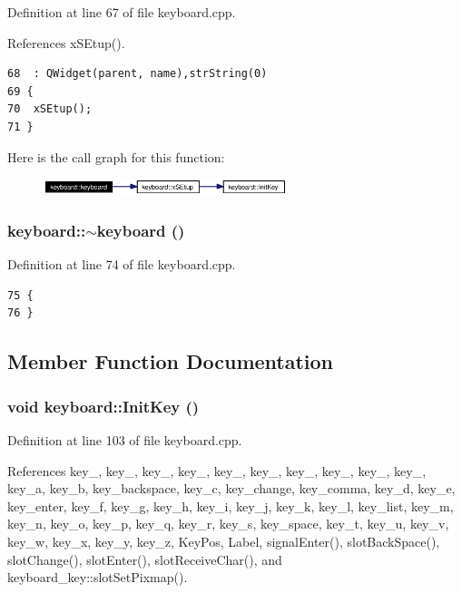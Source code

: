 Definition at line 67 of file keyboard.cpp.

References x\-SEtup().



\footnotesize\begin{verbatim}68  : QWidget(parent, name),strString(0)
69 {
70  xSEtup();
71 }
\end{verbatim}\normalsize 


Here is the call graph for this function:\begin{figure}[H]
\begin{center}
\leavevmode
\includegraphics[width=201pt]{classkeyboard_keyboarda0_cgraph}
\end{center}
\end{figure}
\subsubsection{\setlength{\rightskip}{0pt plus 5cm}keyboard::$\sim${\bf keyboard} ()}\label{classkeyboard_keyboarda1}




Definition at line 74 of file keyboard.cpp.



\footnotesize\begin{verbatim}75 {
76 }
\end{verbatim}\normalsize 


\subsection{Member Function Documentation}
\subsubsection{\setlength{\rightskip}{0pt plus 5cm}void keyboard::Init\-Key ()\hspace{0.3cm}{\tt  [private]}}\label{classkeyboard_keyboardd0}




Definition at line 103 of file keyboard.cpp.

References key\_, key\_, key\_, key\_, key\_, key\_, key\_, key\_, key\_, key\_, key\_\-a, key\_\-b, key\_\-backspace, key\_\-c, key\_\-change, key\_\-comma, key\_\-d, key\_\-e, key\_\-enter, key\_\-f, key\_\-g, key\_\-h, key\_\-i, key\_\-j, key\_\-k, key\_\-l, key\_\-list, key\_\-m, key\_\-n, key\_\-o, key\_\-p, key\_\-q, key\_\-r, key\_\-s, key\_\-space, key\_\-t, key\_\-u, key\_\-v, key\_\-w, key\_\-x, key\_\-y, key\_\-z, Key\-Pos, Label, signal\-Enter(), slot\-Back\-Space(), slot\-Change(), slot\-Enter(), slot\-Receive\-Char(), and keyboard\_\-key::slot\-Set\-Pixmap().


